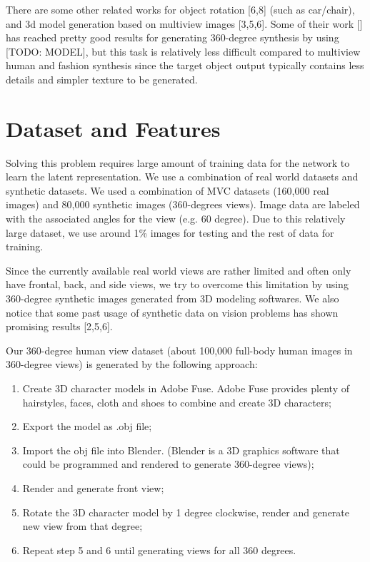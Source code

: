 \documentclass[10pt,conference]{IEEEtran}
\begin{document}
There are some other related works for object rotation [6,8] (such as car/chair), and 3d model generation based on multiview images [3,5,6]. Some of their work [] has reached pretty good results for generating 360-degree synthesis by using [TODO: MODEL], but this task is relatively less difficult compared to multiview human and fashion synthesis since the target object output typically contains less details and simpler texture to be generated. 

\section{Dataset and Features}
Solving this problem requires large amount of training data for the network to learn the latent representation. We use a combination of real world datasets and synthetic datasets. We used a combination of MVC datasets (160,000 real images) and 80,000 synthetic images (360-degrees views). Image data are labeled with the associated angles for the view (e.g. 60 degree). Due to this relatively large dataset, we use around 1\% images for testing and the rest of data for training.

Since the currently available real world views are rather limited and often only have frontal, back, and side views, we try to overcome this limitation by using 360-degree synthetic images generated from 3D modeling softwares. We also notice that some past usage of synthetic data on vision problems has shown promising results [2,5,6].

Our 360-degree human view dataset (about 100,000 full-body human images in 360-degree views) is generated by the following approach:
\renewcommand{\labelenumi}{\roman{enumi}}
 \begin{enumerate}
   \item Create 3D character models in Adobe Fuse. Adobe Fuse provides plenty of hairstyles, faces, cloth and shoes to combine and create 3D characters;
   \item Export the model as .obj file;
   \item Import the obj file into Blender. (Blender is a 3D graphics software that could be programmed and rendered to generate 360-degree views);
   \item Render and generate front view;
   \item Rotate the 3D character model by 1 degree clockwise, render and generate new view from that degree;
   \item Repeat step 5 and 6 until generating views for all 360 degrees.   
 \end{enumerate}
\end{document}

